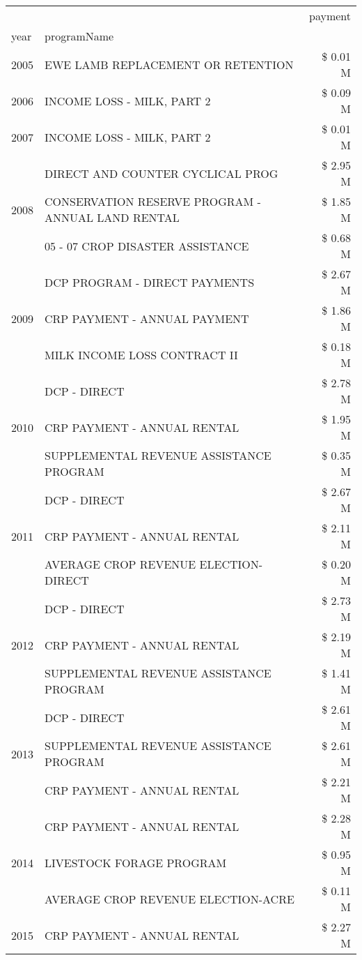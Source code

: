 \begin{tabular}{llr}
\toprule
 &  & payment \\
year & programName &  \\
\midrule
2005 & EWE LAMB REPLACEMENT OR RETENTION & \$ 0.01 M \\
\cline{1-3}
2006 & INCOME LOSS - MILK, PART 2 & \$ 0.09 M \\
\cline{1-3}
2007 & INCOME LOSS - MILK, PART 2 & \$ 0.01 M \\
\cline{1-3}
\multirow[t]{3}{*}{2008} & DIRECT AND COUNTER CYCLICAL PROG & \$ 2.95 M \\
 & CONSERVATION RESERVE PROGRAM - ANNUAL LAND RENTAL & \$ 1.85 M \\
 & 05 - 07 CROP DISASTER ASSISTANCE & \$ 0.68 M \\
\cline{1-3}
\multirow[t]{3}{*}{2009} & DCP PROGRAM - DIRECT PAYMENTS & \$ 2.67 M \\
 & CRP PAYMENT - ANNUAL PAYMENT & \$ 1.86 M \\
 & MILK INCOME LOSS CONTRACT II & \$ 0.18 M \\
\cline{1-3}
\multirow[t]{3}{*}{2010} & DCP - DIRECT & \$ 2.78 M \\
 & CRP PAYMENT - ANNUAL RENTAL & \$ 1.95 M \\
 & SUPPLEMENTAL REVENUE ASSISTANCE PROGRAM & \$ 0.35 M \\
\cline{1-3}
\multirow[t]{3}{*}{2011} & DCP - DIRECT & \$ 2.67 M \\
 & CRP PAYMENT - ANNUAL RENTAL & \$ 2.11 M \\
 & AVERAGE CROP REVENUE ELECTION-DIRECT & \$ 0.20 M \\
\cline{1-3}
\multirow[t]{3}{*}{2012} & DCP - DIRECT & \$ 2.73 M \\
 & CRP PAYMENT - ANNUAL RENTAL & \$ 2.19 M \\
 & SUPPLEMENTAL REVENUE ASSISTANCE PROGRAM & \$ 1.41 M \\
\cline{1-3}
\multirow[t]{3}{*}{2013} & DCP - DIRECT & \$ 2.61 M \\
 & SUPPLEMENTAL REVENUE ASSISTANCE PROGRAM & \$ 2.61 M \\
 & CRP PAYMENT - ANNUAL RENTAL & \$ 2.21 M \\
\cline{1-3}
\multirow[t]{3}{*}{2014} & CRP PAYMENT - ANNUAL RENTAL & \$ 2.28 M \\
 & LIVESTOCK FORAGE PROGRAM & \$ 0.95 M \\
 & AVERAGE CROP REVENUE ELECTION-ACRE & \$ 0.11 M \\
\cline{1-3}
\multirow[t]{3}{*}{2015} & CRP PAYMENT - ANNUAL RENTAL & \$ 2.27 M \\

\end{tabular}
